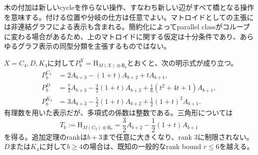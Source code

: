 \documentclass[12pt]{amsart}
\theoremstyle{definition}
\theoremstyle{remark}
\numberwithin{equation}{section}
\newcommand{\HCh}{\mathrm{H}}
\newcommand{\Bmat}{\mathsf{B}}
\begin{document}
木の付加は新しいcycleを作らない操作、すなわち新しい辺がすべて橋となる操作を意味する。付ける位置や分岐の仕方は任意でよい。マトロイドとしての主張には非連結グラフによる表示も含まれる。簡約化によってparallel classがコループに変わる場合があるため、上のマトロイドに関する仮定は十分条件であり、あらゆるグラフ表示の同型分類を主張するものではない。

$X=C_4,D,K_4$に対して$P_b^X=\HCh_{M(X)\oplus\Bmat_b}$とおくと、次の明示式が成り立つ。
\begin{align}
 P_b^{C_4}&=2A_{b+3}-(1+t)A_{b+2}+tA_{b+1},\label{ja-c4}\\
 P_b^D&=\frac73A_{b+3}-\frac32(1+t)A_{b+2}
       +\frac16(t^2+4t+1)A_{b+1},\label{ja-diamond}\\
 P_b^{K_4}&=3A_{b+3}-\frac52(1+t)A_{b+2}
       +\frac12(1+t)^2A_{b+1}.\label{ja-k4}
\end{align}
有理数を用いた表示だが、多項式の係数は整数である。三角形については
\begin{equation}\label{ja-triangle}
 T_b:=\HCh_{M(C_3)\oplus\Bmat_b}
 =\frac32A_{b+2}-\frac12(1+t)A_{b+1}
\end{equation}
を得る。追加定理のrankは$b+3$まで任意に大きくなり、rank 3に制限されない。$D$または$K_4$に対して$b\geq4$の場合は、既知の一般的なrank bound $r\leq6$を越える。
\end{document}
